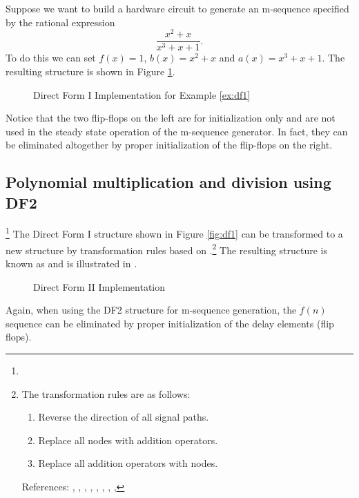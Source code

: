 \begin{example}
\label{ex:df1}
Suppose we want to build a hardware circuit to 
generate an m-sequence specified by the rational expression
\[ \frac{x^2+x}{x^3+x+1}. \]
To do this we can set $f(x)=1$, $b(x)=x^2+x$ and $a(x)=x^3+x+1$.
The resulting structure is shown in Figure \ref{fig:ex-df1}.
\begin{figure}[ht]
\caption{
   Direct Form I Implementation for Example \ref{ex:df1}
   \label{fig:ex-df1}
   }
\end{figure}
Notice that the two flip-flops on the left are for initialization 
only and are not used in the steady state operation of the m-sequence
generator.
In fact, they can be eliminated altogether by proper initialization of 
the flip-flops on the right.
\end{example}

\subsection{Polynomial multiplication and division using DF2}
\footnote{
  }
\label{sec:df2}
The Direct Form I structure shown in Figure \ref{fig:df1} can be transformed
to a new structure by transformation rules based on 
.\footnote{
   The transformation rules are as follows:
   \begin{enumerate}
   \setlength{\itemsep}{0ex}
   \item Reverse the direction of all signal paths.
   \item Replace all nodes with addition operators.
   \item Replace all addition operators with nodes.
   \end{enumerate}
   References:
   ,
   ,
   ,
   ,
   ,
   ,
   ,
   ,
   }
The resulting structure is known as 
and is illustrated in .
\begin{figure}[ht]
\caption{
   Direct Form II Implementation
   \label{fig:df2}
   }
\end{figure}
Again, when using the DF2 structure for m-sequence generation,
the $\dot{f}(n)$ sequence can be eliminated by proper initialization of
the delay elements (flip flops).

